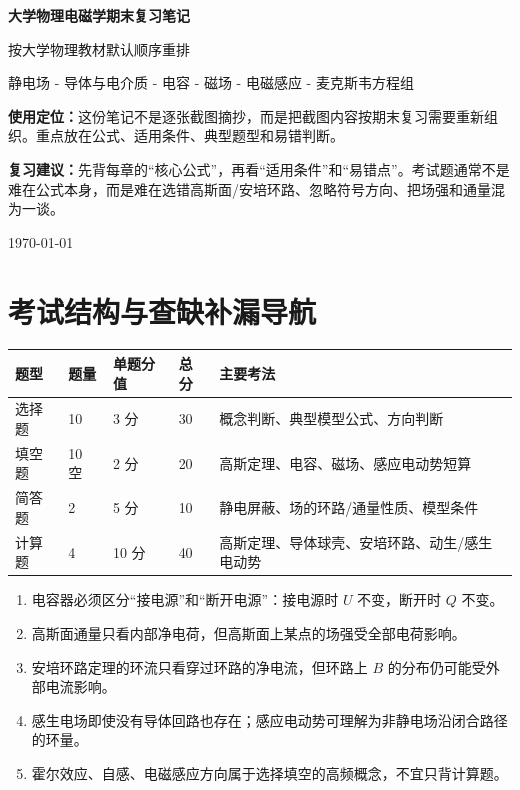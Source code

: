 \documentclass[UTF8,zihao=-4]{ctexart}
\begin{document}
\begin{titlepage}
\centering
\vspace*{2.5cm}
{\Huge\bfseries\sffamily 大学物理电磁学期末复习笔记\par}
\vspace{0.8cm}
{\Large 按大学物理教材默认顺序重排\par}
\vspace{0.5cm}
{\large 静电场 - 导体与电介质 - 电容 - 磁场 - 电磁感应 - 麦克斯韦方程组\par}
\vfill
\begin{tcolorbox}[colback=lightblue,colframe=mainblue,width=0.86\textwidth,arc=2mm]
\textbf{使用定位：}这份笔记不是逐张截图摘抄，而是把截图内容按期末复习需要重新组织。重点放在公式、适用条件、典型题型和易错判断。\par
\textbf{复习建议：}先背每章的“核心公式”，再看“适用条件”和“易错点”。考试题通常不是难在公式本身，而是难在选错高斯面/安培环路、忽略符号方向、把场强和通量混为一谈。
\end{tcolorbox}
\vfill
{\large \today\par}
\end{titlepage}

\tableofcontents
\newpage

\section{考试结构与查缺补漏导航}

\begin{longtable}{p{}p{}p{}p{}p{}}
\toprule
\textbf{题型} & \textbf{题量} & \textbf{单题分值} & \textbf{总分} & \textbf{主要考法} \\
\midrule
选择题 & 10 & 3 分 & 30 & 概念判断、典型模型公式、方向判断 \\
填空题 & 10 空 & 2 分 & 20 & 高斯定理、电容、磁场、感应电动势短算 \\
简答题 & 2 & 5 分 & 10 & 静电屏蔽、场的环路/通量性质、模型条件 \\
计算题 & 4 & 10 分 & 40 & 高斯定理、导体球壳、安培环路、动生/感生电动势 \\
\bottomrule
\end{longtable}

\begin{keybox}[按模拟卷补强的重点]
\begin{enumerate}
  \item 电容器必须区分“接电源”和“断开电源”：接电源时 $U$ 不变，断开时 $Q$ 不变。
  \item 高斯面通量只看内部净电荷，但高斯面上某点的场强受全部电荷影响。
  \item 安培环路定理的环流只看穿过环路的净电流，但环路上 $B$ 的分布仍可能受外部电流影响。
  \item 感生电场即使没有导体回路也存在；感应电动势可理解为非静电场沿闭合路径的环量。
  \item 霍尔效应、自感、电磁感应方向属于选择填空的高频概念，不宜只背计算题。
\end{enumerate}
\end{keybox}
\end{document}
